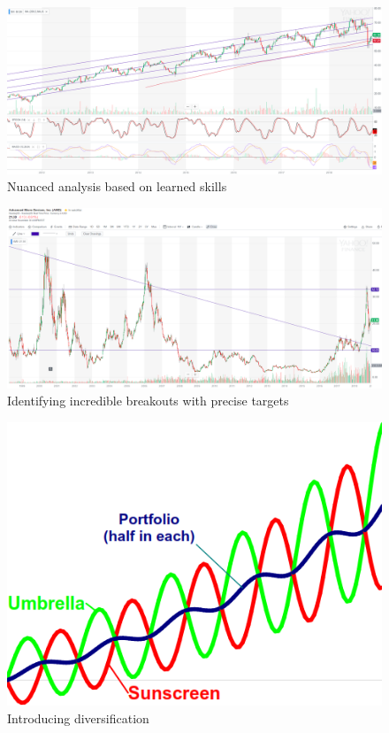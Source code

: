 \documentclass{article}
\begin{document}
\vspace{10pt}

\begin{figure}[!htb]
    \centering
    \includegraphics[width=\textwidth]{imgs/95.png}
    \caption{Nuanced analysis based on learned skills}
\end{figure}

\vspace{10pt}

\begin{figure}[!htb]
    \centering
    \includegraphics[width=\textwidth]{imgs/96.png}
    \caption{Identifying incredible breakouts with precise targets}
\end{figure}

\vspace{10pt}

\begin{figure}[!htb]
    \centering
    \includegraphics[width=.7\textwidth]{imgs/97.png}
    \caption{Introducing diversification}
\end{figure}
\end{document}
